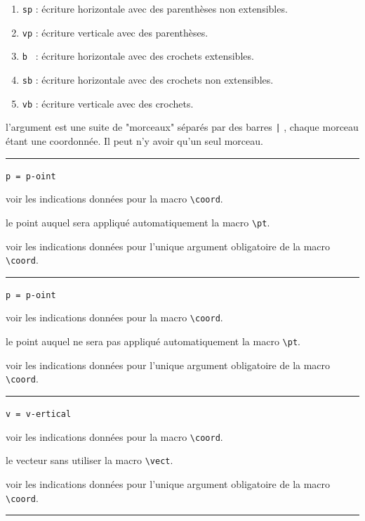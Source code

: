 \documentclass[12pt,a4paper]{book}
\newcommand\env[1]{\texttt{#1}}
\newcommand\macro[1]{\env{\textbackslash{}#1}}
\theoremstyle{definition}
\newcommand\separation{
	\medskip
	\hfill\rule{0.5\textwidth}{0.75pt}\hfill
	\medskip
}
\newcommand\mwhyprefix[2]{%
	\texttt{#1 = #1-#2}%
}
\begin{document}
{{\begin{enumerate}
	\item \verb+sp+ : écriture horizontale avec des parenthèses non extensibles.

	\item \verb+vp+ : écriture verticale avec des parenthèses.

	\item \verb+b + : écriture horizontale avec des crochets extensibles.

	\item \verb+sb+ : écriture horizontale avec des crochets non extensibles.

	\item \verb+vb+ : écriture verticale avec des crochets.
\end{enumerate}


\IDarg{} l'argument est une suite de "morceaux" séparés par des barres \verb+|+ , chaque morceau étant une coordonnée. Il peut n'y avoir qu'un seul morceau.


\separation


 \hfill \mwhyprefix{p}{oint}

\IDoption{} voir les indications données pour la macro \macro{coord}.

 le point auquel sera appliqué automatiquement la macro \macro{pt}.

 voir les indications données pour l'unique argument obligatoire de la macro \macro{coord}.


\separation


 \hfill \mwhyprefix{p}{oint}

\IDoption{} voir les indications données pour la macro \macro{coord}.

 le point auquel ne sera pas appliqué automatiquement la macro \macro{pt}.

 voir les indications données pour l'unique argument obligatoire de la macro \macro{coord}.


\separation


 \hfill \mwhyprefix{v}{ertical}

\IDoption{} voir les indications données pour la macro \macro{coord}.

 le vecteur sans utiliser la macro \macro{vect}.

 voir les indications données pour l'unique argument obligatoire de la macro \macro{coord}.


\separation


}}
\end{document}
